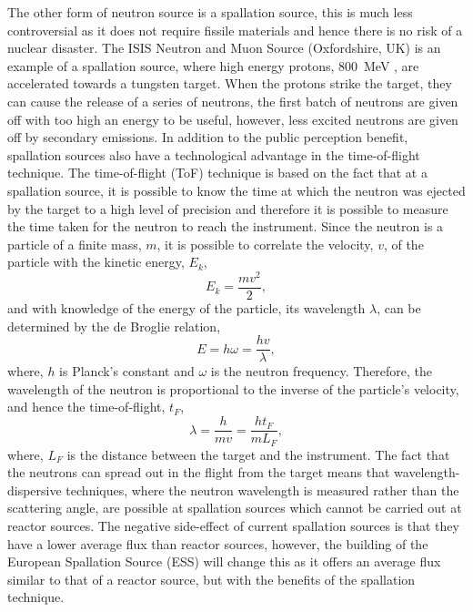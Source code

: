 The other form of neutron source is a spallation source, this is much less controversial as it does not require fissile materials and hence there is no risk of a nuclear disaster.
The ISIS Neutron and Muon Source (Oxfordshire, UK) is an example of a spallation source, where high energy protons, \SI{800}{\mega\eV} \cite{noauthor_isis_nodate-1}, are accelerated towards a tungsten target.
When the protons strike the target, they can cause the release of a series of neutrons, the first batch of neutrons are given off with too high an energy to be useful, however, less excited neutrons are given off by secondary emissions.
In addition to the public perception benefit, spallation sources also have a technological advantage in the time-of-flight technique.
The time-of-flight (ToF) technique is based on the fact that at a spallation source, it is possible to know the time at which the neutron was ejected by the target to a high level of precision and therefore it is possible to measure the time taken for the neutron to reach the instrument.
Since the neutron is a particle of a finite mass, $m$, it is possible to correlate the velocity, $v$, of the particle with the kinetic energy, $E_k$,
%
\begin{equation}
    E_k = \frac{mv^2}{2},
\end{equation}
%
and with knowledge of the energy of the particle, its wavelength $\lambda$, can be determined by the de Broglie relation,
%
\begin{equation}
    E = h\omega = \frac{hv}{\lambda},
\end{equation}
%
where, $h$ is Planck's constant and $\omega$ is the neutron frequency.
Therefore, the wavelength of the neutron is proportional to the inverse of the particle's velocity, and hence the time-of-flight, $t_F$,
%
\begin{equation}
    \lambda = \frac{h}{mv} = \frac{ht_F}{mL_F},
\end{equation}
%
where, $L_F$ is the distance between the target and the instrument.
The fact that the neutrons can spread out in the flight from the target means that wavelength-dispersive techniques, where the neutron wavelength is measured rather than the scattering angle, are possible at spallation sources which cannot be carried out at reactor sources.
The negative side-effect of current spallation sources is that they have a lower average flux than reactor sources, however, the building of the European Spallation Source (ESS) will change this as it offers an average flux similar to that of a reactor source, but with the benefits of the spallation technique.

